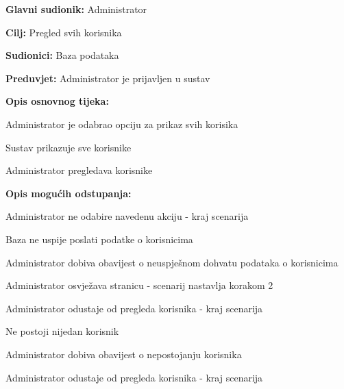 					\noindent {}
					\begin{packed_item}
	
						\item \textbf{Glavni sudionik: }Administrator
						\item  \textbf{Cilj:} Pregled svih korisnika
						\item  \textbf{Sudionici:} Baza podataka
						\item  \textbf{Preduvjet:} Administrator je prijavljen u sustav
						\item  \textbf{Opis osnovnog tijeka:}
						
						\item[] \begin{packed_enum}
							\item Administrator je odabrao opciju za prikaz svih korisika
							\item Sustav prikazuje sve korisnike
							\item Administrator pregledava korisnike
						\end{packed_enum}
						
						\eject

						\item  \textbf{Opis mogućih odstupanja:}

						\item[] \begin{packed_item}
							\item[1.a] Administrator ne odabire navedenu akciju - kraj scenarija
							\item[2.a] Baza ne uspije poslati podatke o korisnicima
							\item[] \begin{packed_enum}
								
								\item Administrator dobiva obavijest o neuspješnom dohvatu podataka o korisnicima
								\item
									\begin{packed_enum}
										\item Administrator osvježava stranicu - scenarij nastavlja korakom 2
										\item Administrator odustaje od pregleda korisnika - kraj scenarija
									\end{packed_enum}
							
							\end{packed_enum}	
							\item[2.b] Ne postoji nijedan korisnik
							\item[] \begin{packed_enum}
								
								\item Administrator dobiva obavijest o nepostojanju korisnika
								\item Administrator odustaje od pregleda korisnika - kraj scenarija
							
							\end{packed_enum}
						\end{packed_item}	
					\end{packed_item}

